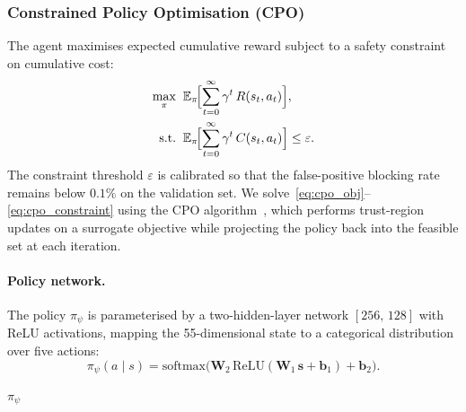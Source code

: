 \documentclass[journal,twoside]{IEEEtran}
\begin{document}
\subsubsection{Constrained Policy Optimisation (CPO)}
The agent maximises expected cumulative reward subject to a safety
constraint on cumulative cost:
\begin{align}
  \max_{\pi}\;&\;
    \mathbb{E}_{\pi}\!\Bigl[\sum_{t=0}^{\infty}\gamma^t\,
    R(s_t,a_t)\Bigr], \label{eq:cpo_obj}\\
  \text{s.t.}\;&\;
    \mathbb{E}_{\pi}\!\Bigl[\sum_{t=0}^{\infty}\gamma^t\,
    C(s_t,a_t)\Bigr] \le \varepsilon. \label{eq:cpo_constraint}
\end{align}
The constraint threshold $\varepsilon$ is calibrated so that the
false-positive blocking rate remains below $0.1\%$ on the validation
set.  We solve~\eqref{eq:cpo_obj}--\eqref{eq:cpo_constraint} using the
CPO algorithm~\cite{achiam2017constrained}, which performs trust-region
updates on a surrogate objective while projecting the policy back into
the feasible set at each iteration.

\paragraph{Policy network.}
The policy $\pi_\psi$ is parameterised by a two-hidden-layer network
$[256,\,128]$ with ReLU activations, mapping the 55-dimensional state to
a categorical distribution over five actions:
\begin{equation}
  \pi_\psi(a\mid s)
  = \mathrm{softmax}\!\bigl(
    \mathbf{W}_2\,\mathrm{ReLU}(
      \mathbf{W}_1\,\mathbf{s}+\mathbf{b}_1)
    +\mathbf{b}_2
  \bigr).
  \label{eq:policy}
\end{equation}

\begin{algorithm}[t]
\DontPrintSemicolon
\SetAlgoLined
{}
\Return $\pi_\psi$\;
\caption{Constrained Policy Optimisation (CPO) for Response Agent}
\label{alg:cpo}
\end{algorithm}
\end{document}

